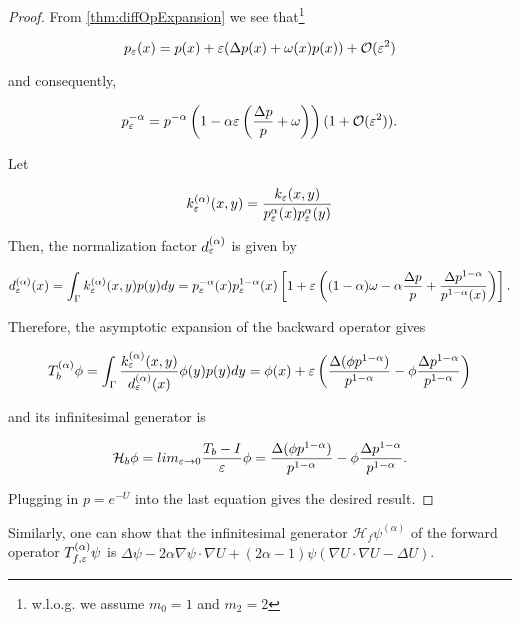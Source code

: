 \begin{proof}
From \ref{thm:diffOpExpansion} we see that\footnote{w.l.o.g. we assume $m_0=1$ and $m_2=2$} 

\begin{equation*}
p_\varepsilon(x)=p(x)+\varepsilon (\Delta p(x)+ \omega(x)p(x))+\mathcal{O}(\varepsilon^2)
\end{equation*}

and consequently,

\begin{equation*}
p_\varepsilon^{-\alpha}=p^{-\alpha}\left(1-\alpha\varepsilon \left(\frac{\Delta p}{p}+\omega \right) \right)(1+\mathcal{O}(\varepsilon^2)).
\end{equation*}

Let

\begin{equation*}
k_\varepsilon^{(\alpha)}(x,y)=\frac{k_\varepsilon(x,y)}{p_\varepsilon^{\alpha}(x)p_\varepsilon^{\alpha}(y)}
\end{equation*}

Then, the normalization factor $d_\varepsilon^{(\alpha)}$ is given by

\begin{equation*}
d_\varepsilon^{(\alpha)}(x)=\int_\Gamma k_\varepsilon^{(\alpha)}(x,y)p(y)dy = 
p_\varepsilon^{-\alpha}(x)p_\varepsilon^{1-\alpha}(x)\left[1+\varepsilon \left((1-\alpha)\omega - \alpha\frac{\Delta p}{p}+\frac{\Delta p^{1-\alpha}}{p^{1-\alpha}(x)} \right) \right].
\end{equation*}

Therefore, the asymptotic expansion of the backward operator gives

\begin{equation*}
T_b^{(\alpha)}\phi = \int_\Gamma \frac{k_\varepsilon^{(\alpha)}(x,y)}{d_\varepsilon^{(\alpha)}(x)}\phi(y)p(y)dy = \phi(x) + \varepsilon\left(\frac{\Delta(\phi p^{1-\alpha})}{p^{1-\alpha}}-\phi \frac{\Delta p^{1-\alpha}}{p^{1-\alpha}} \right)
\end{equation*}

and its infinitesimal generator is 

\begin{equation*}
\mathcal{H}_b\phi =
lim_{\varepsilon\rightarrow 0}\frac{T_b-I}{\varepsilon}\phi =
\frac{\Delta(\phi p^{1-\alpha})}{p^{1-\alpha}}-\phi \frac{\Delta p^{1-\alpha}}{p^{1-\alpha}}.
\end{equation*}

Plugging in $p=e^{-U}$ into the last equation gives the desired result.
\end{proof}

Similarly, one can show that the infinitesimal generator $\mathcal{H}_f\psi^{(\alpha)}$ of the forward operator $T_{f,\varepsilon}^{(\alpha)}\psi$ is $\Delta\psi - 2\alpha\nabla\psi\cdot\nabla U + (2\alpha - 1)\psi(\nabla U\cdot\nabla U - \Delta U)$.

